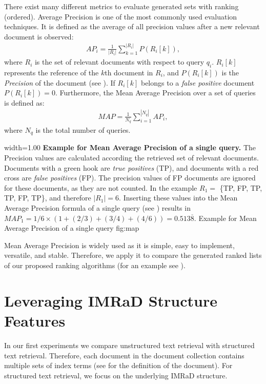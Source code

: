 There exist many different metrics to evaluate generated sets with ranking (ordered). Average Precision is one of the most commonly used evaluation techniques. It is defined as the average of all precision values after a new relevant document is observed:
\begin{align}
  \label{map_of_a_single_query}
  \mathit{AP}_i = \frac{1}{|R_i|}\sum_{k = 1}^{|R_i|} P(R_i[k]),
\end{align}
where $R_i$ is the set of relevant documents with respect to query $q_i$. $R_i[k]$ represents the reference of the $k$th document in $R_i$, and $P(R_i[k])$ is the \textit{Precision} of the document (see ). If $R_i[k]$ belongs to a \textit{false positive} document $P(R_i[k]) = 0$. Furthermore, the Mean Average Precision over a set of queries is defined as:
\begin{align}
  \mathit{MAP} = \frac{1}{N_q}\sum_{i = 1}^{|N_q|} \mathit{AP}_i,
\end{align}
where $N_q$ is the total number of queries.

      {width=1.00\textwidth}
      {\textbf{Example for Mean Average Precision of a single query.} The Precision values are calculated according the retrieved set of relevant documents. Documents with a green hook are \textit{true positives} (TP), and documents with a red cross are \textit{false positives} (FP). The precision values of FP documents are ignored for these documents, as they are not counted. In the example $R_1 =$ \{TP, FP, TP, TP, FP, TP\}, and therefore $|R_1| = 6$. Inserting these values into the Mean Average Precision formula of a single query (see ) results in $\mathit{MAP}_1 = 1/6 \times (1 + (2/3) + (3/4) + (4/6)) = 0.513\overline{8}$.}
      {Example for Mean Average Precision of a single query}
      {fig:map}

 Mean Average Precision is widely used as it is simple, easy to implement, versatile, and stable. Therefore, we apply it to compare the generated ranked lists of our proposed ranking algorithms (for an example see ).


\section{Leveraging IMRaD Structure Features}
\label{sec:leveraging_imrad_structure_features}

In our first experiments we compare unstructured text retrieval with structured text retrieval. Therefore, each document in the document collection contains multiple sets of index terms (see  for the definition of the document). For structured text retrieval, we focus on the underlying IMRaD structure.


